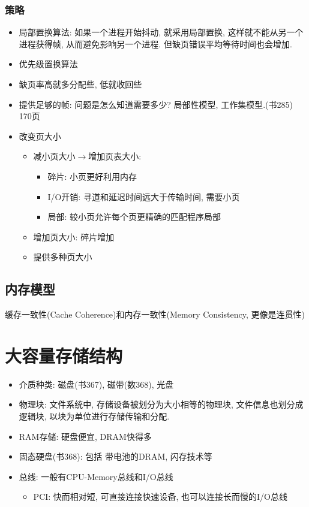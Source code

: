 \documentclass[a4paper, UTF8]{article}
\begin{document}
\subsubsection{策略}
\begin{itemize}
\item 局部置换算法: 如果一个进程开始抖动, 就采用局部置换, 这样就不能从另一个进程获得帧, 从而避免影响另一个进程. 但缺页错误平均等待时间也会增加.
\item 优先级置换算法
\item 缺页率高就多分配些, 低就收回些
\item 提供足够的帧: 问题是怎么知道需要多少? 局部性模型, 工作集模型.(书285)
170页
\item 改变页大小
	\begin{itemize}
	\item 减小页大小$\rightarrow$增加页表大小:
		\begin{itemize}
		\item 碎片: 小页更好利用内存
		\item I/O开销: 寻道和延迟时间远大于传输时间, 需要小页
		\item 局部: 较小页允许每个页更精确的匹配程序局部
		\end{itemize}
	\item 增加页大小: 碎片增加
	\item 提供多种页大小
	\end{itemize}
\end{itemize}

\subsection{内存模型}
缓存一致性(Cache Coherence)和内存一致性(Memory Consistency, 更像是连贯性)

\newpage
\section{大容量存储结构}
\begin{itemize}
\item 介质种类: 磁盘(书367), 磁带(数368), 光盘
\item 物理块: 文件系统中, 存储设备被划分为大小相等的物理块, 文件信息也划分成逻辑块, 以块为单位进行存储传输和分配.
\item RAM存储: 硬盘便宜, DRAM快得多
\item 固态硬盘(书368): 包括 带电池的DRAM, 闪存技术等
\item 总线: 一般有CPU-Memory总线和I/O总线
	\begin{itemize}
	\item PCI: 快而相对短, 可直接连接快速设备, 也可以连接长而慢的I/O总线
	\end{itemize}
\end{itemize}
\end{document}
